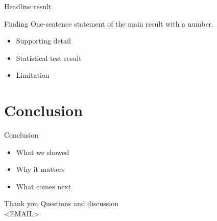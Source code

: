\documentclass[aspectratio=169,12pt]{beamer}
\begin{document}
\begin{frame}{Headline result}
  \begin{block}{Finding}
    One-sentence statement of the main result with a number.
  \end{block}
  \begin{itemize}
    \item Supporting detail
    \item Statistical test result
    \item Limitation
  \end{itemize}
\end{frame}

\section{Conclusion}

\begin{frame}{Conclusion}
  \begin{itemize}
    \item What we showed
    \item Why it matters
    \item What comes next
  \end{itemize}
\end{frame}

\begin{frame}[plain]{Thank you}
  \vfill
  \centering
  \Large Questions and discussion\\[1em]
  \normalsize <EMAIL>
  \vfill
\end{frame}
\end{document}
